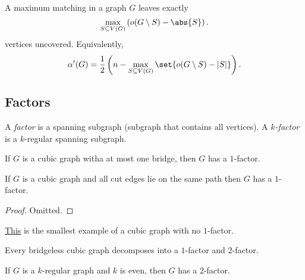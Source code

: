 \begin{theorem}
    A maximum matching in a graph $G$ leaves exactly
    \[
    \max_{S \subseteq V(G)} \left(o(G \setminus S) - \abs{S}\right).
    \]
    vertices uncovered. Equivalently,
    \[
    \alpha'(G) = \frac{1}{2}\left(n - \max_{S \subseteq V(G)} \set{o(G \setminus S) - |S|}\right).
    \]
    \label{thm:BTF}
\end{theorem}


\subsection{Factors}


\begin{definition}
    A \emph{factor} is a spanning subgraph (subgraph that contains all vertices).
    A \emph{$k$-factor} is a $k$-regular spanning subgraph.
\end{definition}

\begin{theorem}[Petersen]
    If $G$ is a cubic graph witha at most one bridge, then 
    $G$ has a $1$-factor.    
\end{theorem}


\begin{theorem}[Petersen]
    If $G$ is a cubic graph and all cut edges lie on the 
    same path then $G$ has a $1$-factor.
\end{theorem}

\begin{proof}
    Omitted.
\end{proof}

\begin{example}
    \href{https://mathworld.wolfram.com/PetersensTheorem.html}{This} 
    is the smallest example of a cubic graph with no $1$-factor.
\end{example}

\begin{theorem}[Petersen]
    Every bridgeless cubic graph decomposes into a $1$-factor 
    and $2$-factor.
\end{theorem}

\begin{theorem}
    If $G$ is a $k$-regular graph and $k$ is even, then $G$ has 
    a $2$-factor.
\end{theorem}